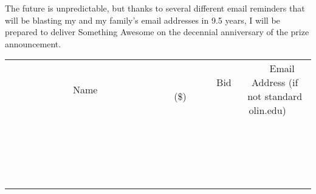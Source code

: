 \documentclass[11pt]{article}
\begin{document}
The future is unpredictable, but thanks to several different email reminders that will be blasting my and my family's email addresses in 9.5 years, I will be prepared to deliver Something Awesome on the decennial anniversary of the prize announcement.
\\[3ex]
\begin{tabular}{c c c}
~~~~~~~~~~~~~Name~~~~~~~~~~~~~ & ~~~~~~~~~Bid (\$)~~~~~~~~~  & ~~~Email Address (if not standard olin.edu)~~~\\
 & & \\
\hline
 & & \\
\hline
 & & \\
\hline
 & & \\
\hline
 & & \\
\hline
 & & \\
\hline
 & & \\
\hline
 & & \\
\hline
 & & \\
\hline
 & & \\
\hline
 & & \\
\hline
 & & \\
\hline
 & & \\
\hline
 & & \\
\hline
 & & \\
\hline
 & & \\
\hline
 & & \\
\hline
 & & \\
\hline
 & & \\
\hline
\end{tabular}
\newpage
\end{document}
